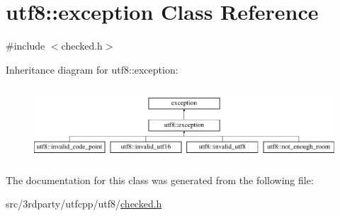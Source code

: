 \hypertarget{classutf8_1_1exception}{}\section{utf8\+:\+:exception Class Reference}
\label{classutf8_1_1exception}


{\ttfamily \#include $<$checked.\+h$>$}

Inheritance diagram for utf8\+:\+:exception\+:\begin{figure}[H]
\begin{center}
\leavevmode
\includegraphics[height=2.745098cm]{classutf8_1_1exception}
\end{center}
\end{figure}


The documentation for this class was generated from the following file\+:\begin{DoxyCompactItemize}
\item 
src/3rdparty/utfcpp/utf8/\hyperlink{checked_8h}{checked.\+h}\end{DoxyCompactItemize}
